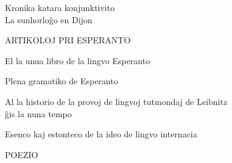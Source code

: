 {\newpage

Kronika katara konjunktivito \dotfill \pageref{kronika} \\
La sunhorloĝo en Dijon \dotfill \pageref{dijon} 

{\centering \sansfont ARTIKOLOJ PRI ESPERANTO\par}
\vspace{1em}

{ %

\setlength{\leftskip}{1em}
\setlength{\parindent}{-1em}
\setlength{\parskip}{0pt}

El la unua libro de la lingvo Esperanto \dotfill \pageref{unualibro}

Plena gramatiko de Esperanto  \dotfill \pageref{plena} 

Al la historio de la provoj de lingvoj tutmondaj de Leibnitz \\ ĝis la
  nuna tempo  \dotfill \pageref{leibnitz} 
  
Esenco kaj estonteco de la ideo de lingvo internacia  \dotfill \pageref{esenco} 

} %

{\centering \sansfont POEZIO\par}

}
